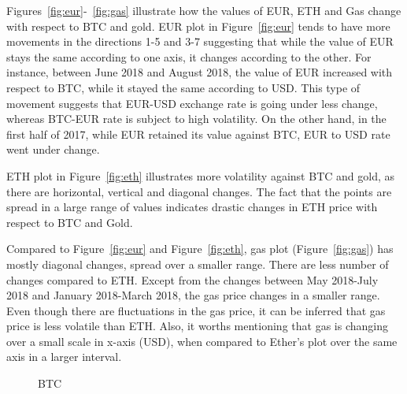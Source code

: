 Figures~\ref{fig:eur}-~\ref{fig:gas} illustrate how the values of EUR, ETH and Gas change with respect to BTC and gold. EUR plot in Figure~\ref{fig:eur} tends to have more movements in the directions 1-5 and 3-7 suggesting that while the value of EUR stays the same according to one axis, it changes according to the other. For instance, between June 2018 and August 2018, the value of EUR increased with respect to BTC, while it stayed the same according to USD. This type of movement suggests that EUR-USD exchange rate is going under less change, whereas BTC-EUR rate is subject to high volatility. On the other hand, in the first half of 2017, while EUR retained its value against BTC, EUR to USD rate went under change.

ETH plot in Figure~\ref{fig:eth} illustrates more volatility against BTC and gold, as there are horizontal, vertical and diagonal changes. The fact that the points are spread in a large range of values indicates drastic changes in ETH price with respect to BTC and Gold.

Compared to Figure~\ref{fig:eur} and Figure~\ref{fig:eth}, gas plot (Figure~\ref{fig:gas}) has mostly diagonal changes, spread over a smaller range. There are less number of changes compared to ETH. Except from the changes between May 2018-July 2018 and January 2018-March 2018, the gas price changes in a smaller range. Even though there are fluctuations in the gas price, it can be inferred that gas price is less volatile than ETH. Also, it worths mentioning that gas is changing over a small scale in x-axis (USD), when compared to Ether's plot over the same axis in a larger interval.



\begin{figure}[!htb]
	\centering
	\hfill
	\caption{BTC}
	\label{fig:Comparison}
\end{figure}

